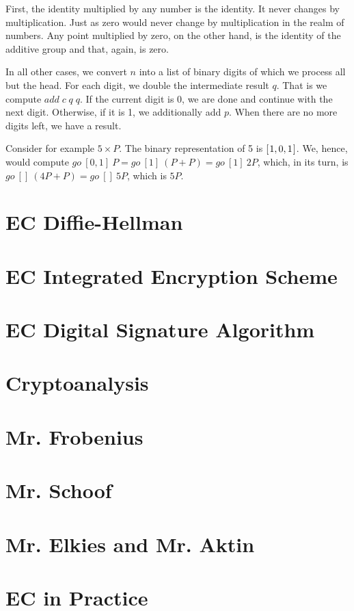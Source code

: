 \documentclass[tikz]{scrreprt}
\newcommand{\Varid}[1]{\mathit{#1}}
\begin{document}
First, the identity multiplied by any number
is the identity. It never changes by multiplication.
Just as zero would never change by multiplication
in the realm of numbers.
Any point multiplied by zero, on the other hand,
is the identity of the additive group and that, again, is zero.

In all other cases, we convert $n$ into a list
of binary digits of which we process all but the head.
For each digit, we double the intermediate result $q$.
That is we compute \ensuremath{\Varid{add}\;\Varid{c}\;\Varid{q}\;\Varid{q}}.
If the current digit is 0, we are done and continue
with the next digit.
Otherwise, if it is 1, we additionally add $p$.
When there are no more digits left,
we have a result.

Consider for example $5 \times P$.
The binary representation of 5 is \ensuremath{[\mskip1.5mu \mathrm{1},\mathrm{0},\mathrm{1}\mskip1.5mu]}.
We, hence, would compute 
$go~[0,1]~P = go~[1]~(P+P) = go~[1]~2P$,
which, in its turn, is 
$go~[]~(4P + P) = go~[]~5P$,
which is $5P$.

\section{EC Diffie-Hellman} 
\section{EC Integrated Encryption Scheme} 
\section{EC Digital Signature Algorithm} 
\section{Cryptoanalysis} 
\section{Mr. Frobenius} 
\section{Mr. Schoof} 
\section{Mr. Elkies and Mr. Aktin} 
\section{EC in Practice} 
\end{document}
